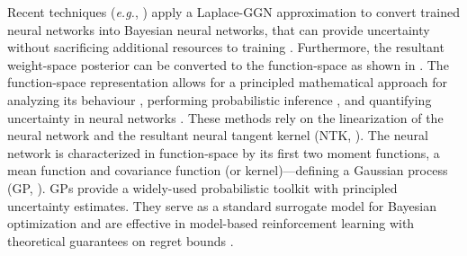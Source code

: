 \documentclass{article} %
\makeatletter
\newcommand{\eg}{\textit{e.g.\@}\xspace}
\makeatother
\begin{document}
Recent techniques (\eg, \cite{ritter2018kfac,khan2019approximate,daxberger2021laplace,fortuin2021bayesian,immer2021scalable}) apply a Laplace-GGN approximation to convert trained neural networks into Bayesian neural networks, that can provide uncertainty without sacrificing additional resources to training \cite{foong2019between}. Furthermore, the resultant weight-space posterior can be converted to the function-space as shown in \cite{khan2019approximate, immer2021improving}. The function-space representation allows for a principled mathematical approach for analyzing its behaviour \cite{cho2009kernel,meronen2020stationary}, performing probabilistic inference \cite{khan2019approximate}, and quantifying uncertainty in neural networks \cite{foong2019between}. These methods rely on the linearization of the neural network and the resultant neural tangent kernel (NTK, \cite{jacot2018neural}). The neural network is characterized in function-space by its first two moment functions, a mean function and covariance function (or kernel)---defining a Gaussian process (GP, \cite{rasmussen2006gaussian}). GPs provide a widely-used probabilistic toolkit with principled uncertainty estimates. They serve as a standard surrogate model for Bayesian optimization \citep{garnett_bayesoptbook_2022} and are effective in model-based reinforcement learning \citep{deisenroth2011pilco} with theoretical guarantees on regret bounds \citep{srinivas2009gaussian}.
\end{document}
